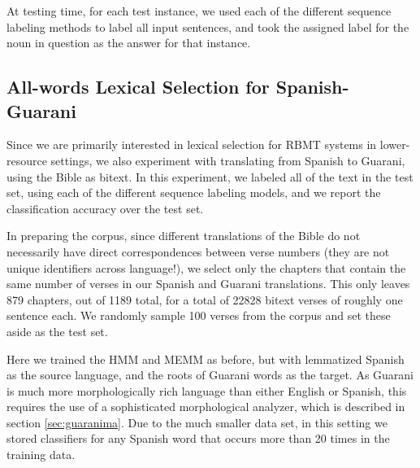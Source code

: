 \documentclass[11pt]{article}
\begin{document}
At testing time, for each test instance, we used each of the different sequence
labeling methods to label all input sentences, and took the assigned label for
the noun in question as the answer for that instance.

\subsection{All-words Lexical Selection for Spanish-Guarani}
Since we are primarily interested in lexical selection for RBMT systems in
lower-resource settings, we also experiment with translating from Spanish to
Guarani, using the Bible as bitext. In this experiment, we labeled all of the
text in the test set, using each of the different sequence labeling models, and
we report the classification accuracy over the test set.

In preparing the corpus, since different translations of the Bible do not
necessarily have direct correspondences between verse numbers (they are not
unique identifiers across language!), we select only the chapters that contain
the same number of verses in our Spanish and Guarani translations.  This only
leaves 879 chapters, out of 1189 total, for a total of 22828 bitext verses of
roughly one sentence each. We randomly sample 100 verses from the corpus and
set these aside as the test set.

Here we trained the HMM and MEMM as before, but with lemmatized Spanish as the
source language, and the roots of Guarani words as the target.  As Guarani is
much more morphologically rich language than either English or Spanish, this
requires the use of a sophisticated morphological analyzer, which is described
in section \ref{sec:guaranima}. Due to the much smaller data set, in this
setting we stored classifiers for any Spanish word that occurs more than 20
times in the training data.
\end{document}
